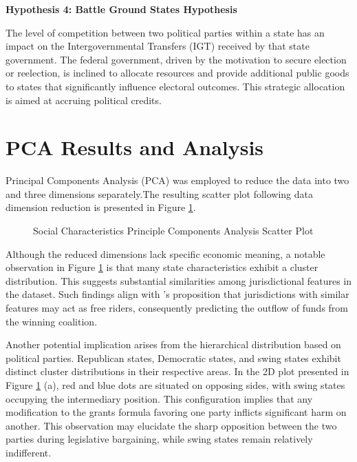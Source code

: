 \documentclass[man]{apa7}
\begin{document}
\textbf{Hypothesis 4: Battle Ground States Hypothesis}

The level of competition between two political parties within a state has an impact on the Intergovernmental Transfers (IGT) received by that state government. The federal government, driven by the motivation to secure election or reelection, is inclined to allocate resources and provide additional public goods to states that significantly influence electoral outcomes. This strategic allocation is aimed at accruing political credits.

\section{PCA Results and Analysis}

Principal Components Analysis (PCA) was employed to reduce the data into two and three dimensions separately.The resulting scatter plot following data dimension reduction is presented in Figure \ref{Figure 2.2}.

\begin{figure}[H]
  \centering  %
  \caption[Principle Components Analysis Scatter Plot]{Social Characteristics Principle Components Analysis Scatter Plot}    %
  \label{Figure 2.2}    %
\end{figure}

Although the reduced dimensions lack specific economic meaning, a notable observation in Figure \ref{Figure 2.2} is that many state characteristics exhibit a cluster distribution. This suggests substantial similarities among jurisdictional features in the dataset. Such findings align with \Textcite{martin2018dividing}'s proposition that jurisdictions with similar features may act as free riders, consequently predicting the outflow of funds from the winning coalition.

Another potential implication arises from the hierarchical distribution based on political parties. Republican states, Democratic states, and swing states exhibit distinct cluster distributions in their respective areas. In the 2D plot presented in Figure \ref{Figure 2.2} (a), red and blue dots are situated on opposing sides, with swing states occupying the intermediary position. This configuration implies that any modification to the grants formula favoring one party inflicts significant harm on another. This observation may elucidate the sharp opposition between the two parties during legislative bargaining, while swing states remain relatively indifferent.
\end{document}
